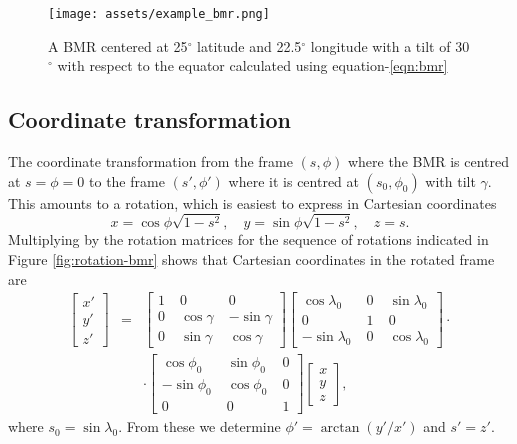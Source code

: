 \documentclass[twoside,12pt]{book}
\begin{document}
\begin{figure}
    \centering
    \texttt{[image: assets/example\_bmr.png]}
    \caption{A BMR centered at 25$^{\circ}$ latitude and 22.5$^{\circ}$ longitude with a tilt of 30$^{\circ}$ with respect to the equator calculated using equation-\ref{eqn:bmr}}
\end{figure}
\subsection{Coordinate transformation}
The coordinate transformation from the frame $(s,\phi)$ where the BMR is centred at $s=\phi=0$ to the frame $(s',\phi')$ where it is centred at $(s_0,\phi_0)$ with tilt $\gamma$. This amounts to a rotation, which is easiest to express in Cartesian coordinates
\begin{equation}
x = \cos\phi\sqrt{1-s^2}, \quad y=\sin\phi\sqrt{1-s^2},\quad z=s.
\end{equation}
Multiplying by the rotation matrices for the sequence of rotations indicated in Figure \ref{fig:rotation-bmr} shows that Cartesian coordinates in the rotated frame are
\begin{eqnarray}\nonumber
\left[
\begin{array}{c}
x'\\
y'\\
z'
\end{array}
\right] &=&
\left[
\begin{array}{ccc}
1\; & 0\; & 0\\
0\; & \cos\gamma\; & -\sin\gamma\\
0\; & \sin\gamma\; & \cos\gamma
\end{array}
\right]
\left[
\begin{array}{ccc}
\cos\lambda_0\; & 0\; & \sin\lambda_0\\
0\; & 1\; & 0\\
-\sin\lambda_0\; & 0\; & \cos\lambda_0
\end{array}
\right]
\cdot\\ 
&&\cdot
\left[
\begin{array}{ccc}
\cos\phi_0\; & \sin\phi_0\; & 0\\
-\sin\phi_0\; & \cos\phi_0\; & 0\\
0 & 0 & 1
\end{array}
\right]
\left[
\begin{array}{c}
x\\
y\\
z
\end{array}
\right],
\end{eqnarray}
where $s_0=\sin\lambda_0$. From these we determine $\phi'=\arctan(y'/x')$ and $s' = z'$.
\end{document}
